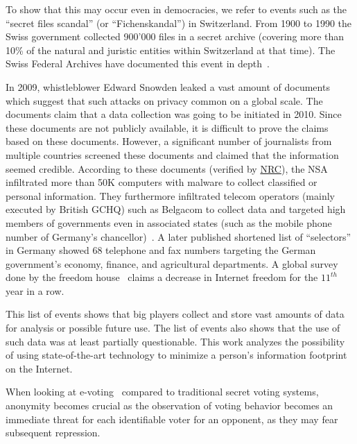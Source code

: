 To show that this may occur even in democracies, we refer to events such as the ``secret files scandal'' (or  ``Fichenskandal'') in Switzerland. From 1900 to 1990 the Swiss government collected 900’000 files in a secret archive (covering more than 10\% of the natural and juristic entities within Switzerland at that time). The Swiss Federal Archives have documented this event in depth~\cite{Leuenberger1989}.

In 2009, whistleblower Edward Snowden leaked a vast amount of documents which suggest that such attacks on privacy common on a global scale. The documents claim that a data collection was going to be initiated in 2010. Since these documents are not publicly available, it is difficult to prove the claims based on these documents. However, a significant number of journalists from multiple countries screened these documents and claimed that the information seemed credible. According to these documents (verified by \href{http://www.nrc.nl/nieuws/2013/11/23/nederland-sinds-1946-doelwit-van-nsa}{NRC}), the NSA infiltrated more than 50K computers with malware to collect classified or personal information. They furthermore infiltrated telecom operators (mainly executed by British GCHQ) such as Belgacom to collect data and targeted high members of governments even in associated states (such as the mobile phone number of Germany's chancellor)~\cite{NCR2013,XKeyscore,Ball2013,Ackerman2013,Greenberg2013}. A later published shortened list of ``selectors'' in Germany showed 68 telephone and fax numbers targeting the German government's economy, finance, and agricultural departments. A global survey done by the freedom house~\cite{FOTN2020} claims a decrease in Internet freedom for the $\text{11}^{th}$ year in a row.

This list of events shows that big players collect and store vast amounts of data for analysis or possible future use. The list of events also shows that the use of such data was at least partially questionable. This work analyzes the possibility of using state-of-the-art technology to minimize a person's information footprint on the Internet. 

When looking at e-voting~\cite{haenni2008research} compared to traditional secret voting systems, anonymity becomes crucial as the observation of voting behavior becomes an immediate threat for each identifiable voter for an opponent, as they may fear subsequent repression.

